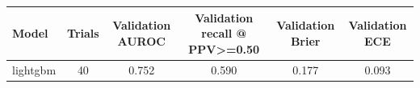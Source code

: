\begin{tabular}{@{}lccccc@{}}
\toprule
Model & Trials & Validation AUROC & Validation recall @ PPV>=0.50 & Validation Brier & Validation ECE\\
\midrule
lightgbm & 40 & 0.752 & 0.590 & 0.177 & 0.093\\
\bottomrule
\end{tabular}
